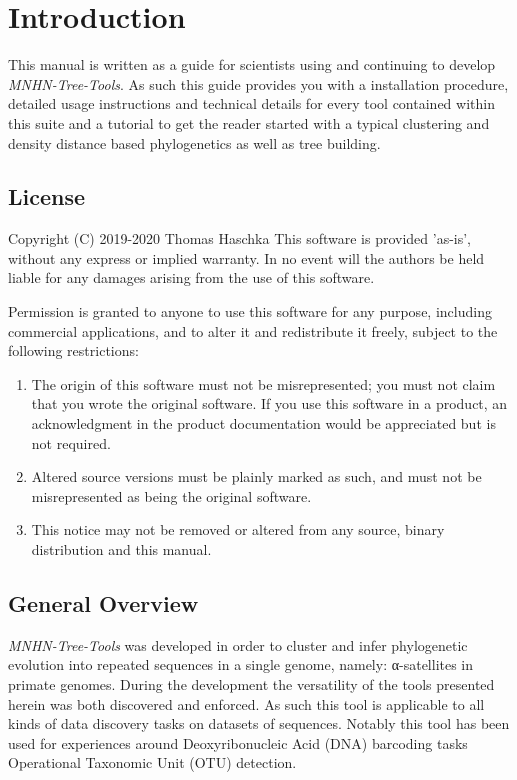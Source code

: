 \chapter{Introduction}

This manual is written as a guide for scientists using and continuing to
develop \emph{MNHN-Tree-Tools}. As such this guide provides you with a
installation procedure, detailed usage instructions and technical
details for every tool contained within this suite and a tutorial to get
the reader started with a typical clustering and density distance
based phylogenetics as well as tree building.

\section{License}
Copyright (C) 2019-2020 Thomas Haschka \newline
This software is provided 'as-is', without any express or implied
warranty.  In no event will the authors be held liable for any damages
arising from the use of this software.

Permission is granted to anyone to use this software for any purpose,
including commercial applications, and to alter it and redistribute it
freely, subject to the following restrictions:

\begin{enumerate}
  \item The origin of this software must not be misrepresented; you must not
    claim that you wrote the original software. If you use this software
   in a product, an acknowledgment in the product documentation would be
   appreciated but is not required.
  \item Altered source versions must be plainly marked as such, and must not be
    misrepresented as being the original software.
  \item This notice may not be removed or altered from any source,
    binary distribution and this manual.
\end{enumerate}

\section{General Overview}

\emph{MNHN-Tree-Tools} was developed in order to cluster and infer
phylogenetic evolution into repeated sequences in a single genome,
namely: α-satellites in primate genomes. During the development
the versatility of the tools presented herein was both discovered and
enforced. As such this tool is applicable to all kinds of data
discovery tasks on datasets of sequences. Notably this tool has been
used for experiences around Deoxyribonucleic Acid (DNA) barcoding tasks
Operational Taxonomic Unit (OTU) detection.

